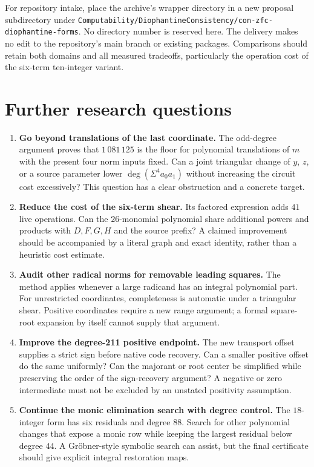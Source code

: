 \documentclass[11pt]{article}
\theoremstyle{definition}
\theoremstyle{remark}
\newcommand{\dd}{\operatorname{deg}}
\newcommand{\file}[1]{\nolinkurl{#1}}
\begin{document}
For repository intake, place the archive's wrapper directory in a new
proposal subdirectory under
\file{Computability/DiophantineConsistency/con-zfc-diophantine-forms}.
No directory number is reserved here. The delivery makes no edit to the
repository's main branch or existing packages. Comparisons should retain
both domains and all measured tradeoffs, particularly the operation cost
of the six-term ten-integer variant.

\section{Further research questions}

\begin{enumerate}
\item \textbf{Go beyond translations of the last coordinate.}
The odd-degree argument proves that $1\,081\,125$ is the floor for
polynomial translations of $m$ with the present four norm inputs fixed.
Can a joint triangular change of $y$, $z$, or a source parameter lower
$\dd(\Sigma^4a_0a_1)$ without increasing the circuit cost excessively?
This question has a clear obstruction and a concrete target.

\item \textbf{Reduce the cost of the six-term shear.}
Its factored expression adds $41$ live operations. Can the $26$-monomial
polynomial share additional powers and products with $D,F,G,H$ and the
source prefix? A claimed improvement should be accompanied by a literal
graph and exact identity, rather than a heuristic cost estimate.

\item \textbf{Audit other radical norms for removable leading squares.}
The method applies whenever a large radicand has an integral polynomial
part. For unrestricted coordinates, completeness is automatic under a
triangular shear. Positive coordinates require a new range argument; a
formal square-root expansion by itself cannot supply that argument.

\item \textbf{Improve the degree-211 positive endpoint.}
The new transport offset supplies a strict sign before native code
recovery. Can a smaller positive offset do the same uniformly? Can the
majorant or root center be simplified while preserving the order of the
sign-recovery argument? A negative or zero intermediate must not be
excluded by an unstated positivity assumption.

\item \textbf{Continue the monic elimination search with degree control.}
The $18$-integer form has six residuals and degree $88$. Search for other
polynomial changes that expose a monic row while keeping the largest
residual below degree $44$. A Gröbner-style symbolic search can assist,
but the final certificate should give explicit integral restoration maps.


\end{enumerate}
\end{document}
